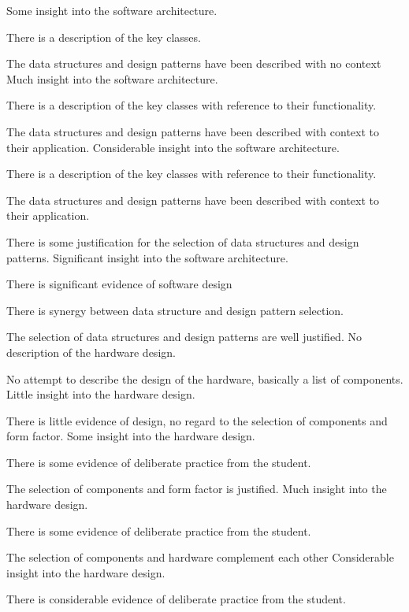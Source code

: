 \documentclass{../../fal_assignment}
\begin{document}
\begin{markingrubric}
	\grade Some insight into the software architecture.
	\par There is a description of the key classes.
	\par The data structures and design patterns have been described with no context
	\grade Much insight into the software architecture.
	\par There is a description of the key classes with reference to their functionality.
	\par The data structures and design patterns have been described with context to their application.
	\grade Considerable insight into the software architecture.
	\par There is a description of the key classes with reference to their functionality.
	\par The data structures and design patterns have been described with context to their application.
	\par There is some justification for the selection of data structures and design patterns.
	\grade Significant insight into the software architecture.
	\par There is significant evidence of software design
	\par There is synergy between data structure and design pattern selection.
	\par The selection of data structures and design patterns are well justified.
	\grade\fail No description of the hardware design.
	\par No attempt to describe the design of the hardware, basically a list of components.
	\grade Little insight into the hardware design.
	\par There is little evidence of design, no regard to the selection of components and form factor.
	\grade Some insight into the hardware design.
	\par There is some evidence of deliberate practice from the student.
	\par The selection of components and form factor is justified.
	\grade Much insight into the hardware design.
	\par There is some evidence of deliberate practice from the student.
	\par The selection of components and hardware complement each other
	\grade Considerable insight into the hardware design.
	\par There is considerable evidence of deliberate practice from the student.

\end{markingrubric}
\end{document}

